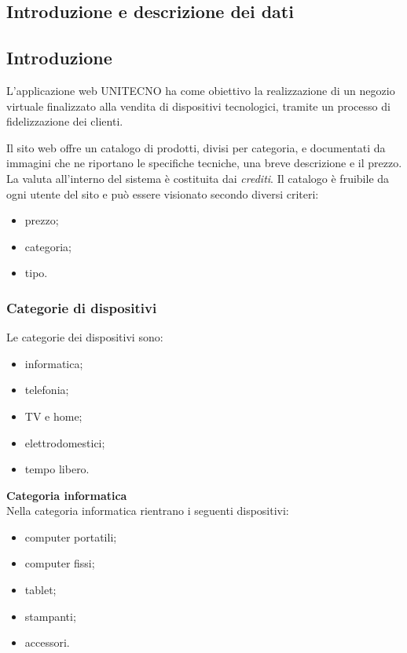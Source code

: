 \documentclass[a4paper, 14pt]{article}
\begin{document}
	\begin{flushleft}
		
	\section{Introduzione e descrizione dei dati}
		\subsection{Introduzione} \label{Introduzione}
			L'applicazione web UNITECNO ha come obiettivo la realizzazione di un negozio virtuale finalizzato alla vendita di dispositivi tecnologici, tramite un processo di fidelizzazione dei clienti.
			
			Il sito web offre un catalogo di prodotti, divisi per categoria,
			e documentati da immagini che ne riportano le specifiche tecniche, una breve descrizione e il prezzo. 
			La valuta all'interno del sistema è costituita dai \textit{crediti}.
			Il catalogo è fruibile da ogni utente del sito e può essere visionato secondo diversi criteri:
			\begin{itemize}
				\item prezzo;
				\item categoria;
				\item tipo.
			\end{itemize}
			
			\subsubsection{Categorie di dispositivi} \label{CategorieDisp}
			Le categorie dei dispositivi sono:
			\begin{itemize}
				\item informatica;
				\item telefonia;
				\item TV e home;
				\item elettrodomestici;
				\item tempo libero.
			\end{itemize}
		
			\bigskip \textbf{Categoria informatica} \\ \smallskip
			Nella categoria informatica rientrano i seguenti dispositivi:
				\begin{itemize}
					\item computer portatili;
					\item computer fissi;
					\item tablet;
					\item stampanti;
					\item accessori.
				\end{itemize}
			

\end{flushleft}
\end{document}

